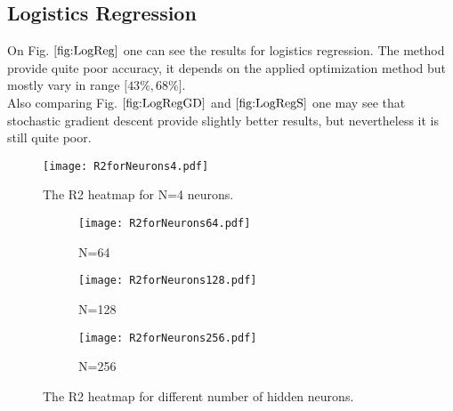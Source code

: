 \documentclass[10pt]{article}
\begin{document}
\subsection{Logistics Regression}
On Fig. $\ref{fig:LogReg}$ one can see the results for logistics regression. The method provide quite poor accuracy, it  depends on the applied optimization method but mostly vary in range $\lbrack 43\% , 68\% \rbrack$.\\
Also comparing Fig. $\ref{fig:LogRegGD}$ and $\ref{fig:LogRegS}$ one may see that stochastic gradient descent provide slightly better results, but nevertheless it is still quite poor.  

	\begin{figure}
		\centering
		\texttt{[image: R2forNeurons4.pdf]}
		\caption[ The R2 heatmap for N=4 neurons.]
		{\small The R2 heatmap for N=4 neurons.} 
		\label{fig:R2NN1}
	\end{figure}

	\begin{figure}
	\centering
			
	\begin{subfigure}[b]{0.9\textwidth}  
		\centering 
		\texttt{[image: R2forNeurons64.pdf]}
		\caption[]%
		{{\small N=64}}    
		\label{fig:mean and std of net24}
	\end{subfigure}
	\hfill
	\begin{subfigure}[b]{0.9\textwidth}   
		\centering 
		\texttt{[image: R2forNeurons128.pdf]}
		\caption[]%
		{{\small N=128}}    
		\label{fig:mean and std of net34}
	\end{subfigure}
	\quad
	\begin{subfigure}[b]{0.9\textwidth}   
		\centering 
		\texttt{[image: R2forNeurons256.pdf]}
		\caption[]%
		{{\small N=256}}    
		\label{fig:mean and std of net44}
	\end{subfigure}
	\caption[ The average and standard deviation of critical parameters ]
	{\small The R2 heatmap for different number of hidden neurons.} 
	\label{fig:R2NN2}
\end{figure}
\end{document}
